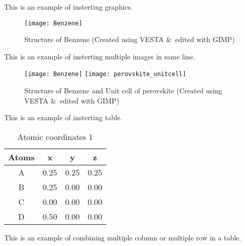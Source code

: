 
This is an example of insterting graphics.

\begin{figure}[H]
	\centering
	\texttt{[image: Benzene]}
	\caption[CH structure]{Structure of Benzene (Created using
	VESTA \&\ edited with GIMP)}
	\label{fig:benzene}
\end{figure}

This is an example of insterting multiple images in same line.

\begin{figure}[H]
	\centering
	\texttt{[image: Benzene]}
	\hspace{0.5cm}
	\texttt{[image: perovskite\_unitcell]}
	\caption[CH \&\ ABO structure]{Structure of Benzene
	and Unit cell of perovskite (Created using VESTA \&\ edited with GIMP)}
\end{figure}


This is an example of insterting table.

\begin{table}[H] %
	\centering
\begin{tabular}{|c|c|c|c|}
	\hline %
	Atoms & x & y & z\\ %
	\hline
	A & 0.25 & 0.25 & 0.25\\
	B & 0.25 & 0.00 & 0.00\\
	C & 0.00 & 0.00 & 0.00\\
	D & 0.50 & 0.00 & 0.00\\
	\hline
\end{tabular}
	\caption[Atomic coordinates 1]{Atomic coordinates 1}
	\label{tab:atom}
\end{table}

This is an example of combining multiple column or multiple row in a table.

